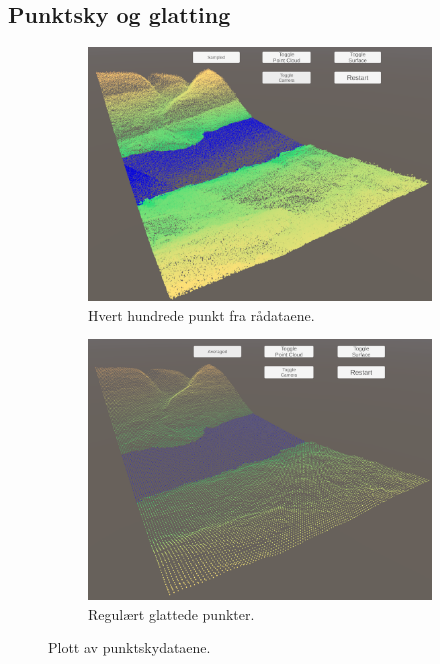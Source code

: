 \documentclass[norsk, doc, 11pt, a4paper]{apa7}  %
\begin{document}
\subsection{Punktsky og glatting}
\begin{figure}[H]
	\centering
	\begin{subfigure}{.5\textwidth}
		\centering
		\includegraphics[width=.9\linewidth]{figs/punktSample.png}
		\caption{Hvert hundrede punkt fra rådataene.}
	\end{subfigure}%
	\begin{subfigure}{.5\textwidth}
		\centering
		\includegraphics[width=.9\linewidth]{figs/punktMean.png}
		\caption{Regulært glattede punkter.}
	\end{subfigure}
	\caption{Plott av punktskydataene.}
\end{figure}
\end{document}
